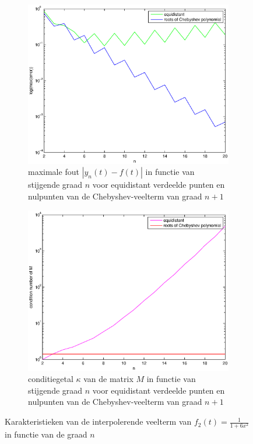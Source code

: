 \documentclass[a4paper]{article}
\begin{document}
\begin{figure}
    \centering
    \begin{subfigure}[b]{\textwidth}
        \centering
        \includegraphics[width=\textwidth]{Jona/error_global_f2.eps}
        \caption{maximale fout $|y_{n}(t)-f(t)|$ in functie van stijgende graad $n$ voor equidistant verdeelde punten en nulpunten van de Chebyshev-veelterm van graad $n+1$}
        \label{fig:error_global_f2}
        \vspace*{1cm}
    \end{subfigure}
    \begin{subfigure}[b]{\textwidth}
        \centering
        \includegraphics[width=\textwidth]{Jona/condition_f2.eps}
        \caption{conditiegetal $\kappa$ van de matrix $M$ in functie van stijgende graad $n$ voor equidistant verdeelde punten en nulpunten van de Chebyshev-veelterm van graad $n+1$}
        \label{fig:condition_f2}
        \vspace*{1cm}
    \end{subfigure}
    \hfill
    \caption{Karakteristieken van de interpolerende veelterm van $f_{2}(t) = \frac{1}{1+6x^{2}}$ in functie van de graad $n$}
    \label{characteristics_f2}
    \end{figure}    
\end{document}

